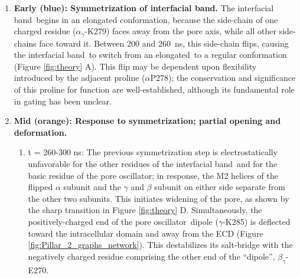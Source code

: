 \documentclass[journal=jacsat,manuscript=article]{achemso}
\newcommand{\fivering}{interfacial band~}
\newcommand{\fiveringnos}{interfacial band}
\newcommand{\triad}{pore oscillator~}
\newcommand{\triadns}{pore oscillator}
\newcommand{\extended}{elongated~}
\begin{document}
\begin{enumerate}
\item {\bf Early  (blue): Symmetrization of \fiveringnos.} The \fivering begins in an elongated conformation, because the side-chain of one charged residue ($\alpha_{\gamma}$-K279) faces away from the pore axis, while all other side-chains face toward it. Between 200 and 260~ns, this side-chain flips, causing the \fivering to switch from an \extended to a regular conformation (Figure \ref{fig:theory} A).  This flip may be dependent upon flexibility introduced by the adjacent proline ($\alpha$P278); the conservation\cite{Jaiteh2016} and significance of this proline for function\cite{Lummis2005} are well-established, although its fundamental role in gating has been unclear. %
\item {\bf Mid  (orange): Response to symmetrization; partial opening and deformation.}
\begin{enumerate}
\item t = 260-300 ns: The previous symmetrization step is electrostatically unfavorable for the other residues of the \fivering and for the basic residue of the \triadns; in response,  the M2 helices of the flipped $\alpha$ subunit and the $\gamma$ and $\beta$ subunit on either side separate from the other two subunits. This initiates widening of the pore, as shown by the sharp transition in Figure \ref{fig:theory} D.   Simultaneously, the positively-charged end of the \triad dipole ($\gamma$-K285) is deflected toward the intracellular domain and away from the ECD (Figure \ref{fig:Pillar_2_graphs_network}). This destabilizes its salt-bridge with the negatively charged residue comprising the other end of the ``dipole'', $\beta_{\gamma}$-E270.  


\end{enumerate}
\end{enumerate}
\end{document}
